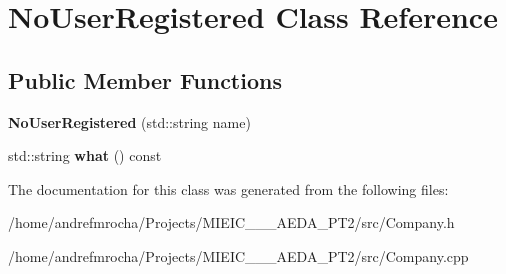 \hypertarget{class_no_user_registered}{}\section{No\+User\+Registered Class Reference}
\label{class_no_user_registered}
\subsection*{Public Member Functions}
\begin{DoxyCompactItemize}
\item 
\mbox{\label{class_no_user_registered_a928e78029870899c7dceeb95be5ed1d9}} 
{\bfseries No\+User\+Registered} (std\+::string name)
\item 
\mbox{\label{class_no_user_registered_a07aae9e65baf017e03fbe3445ff5ec37}} 
std\+::string {\bfseries what} () const
\end{DoxyCompactItemize}


The documentation for this class was generated from the following files\+:\begin{DoxyCompactItemize}
\item 
/home/andrefmrocha/\+Projects/\+M\+I\+E\+I\+C\+\_\+\_\+\_\+\+A\+E\+D\+A\+\_\+\+P\+T2/src/Company.\+h\item 
/home/andrefmrocha/\+Projects/\+M\+I\+E\+I\+C\+\_\+\_\+\_\+\+A\+E\+D\+A\+\_\+\+P\+T2/src/Company.\+cpp\end{DoxyCompactItemize}
